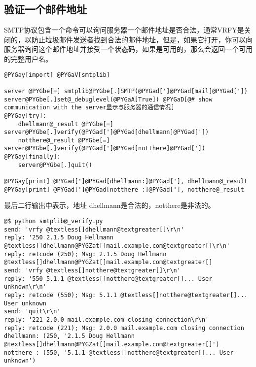\documentclass[a4paper,10pt,english]{manual}
\begin{document}
\subsection{验证一个邮件地址}

SMTP协议包含一个命令可以询问服务器一个邮件地址是否合法，通常VRFY是关闭的，以防止垃圾邮件发送者找到合法的邮件地址，但是，如果它打开，你可以向服务器询问这个邮件地址并接受一个状态码，如果是可用的，那么会返回一个可用的完整用户名。

\begin{Verbatim}[commandchars=@\[\]]
@PYGay[import] @PYGaV[smtplib]

server @PYGbe[=] smtplib@PYGbe[.]SMTP(@PYGad[']@PYGad[mail]@PYGad['])
server@PYGbe[.]set@_debuglevel(@PYGaA[True]) @PYGaD[@# show communication with the server显示与服务器的通信情况]
@PYGay[try]:
    dhellmann@_result @PYGbe[=] server@PYGbe[.]verify(@PYGad[']@PYGad[dhellmann]@PYGad['])
    notthere@_result @PYGbe[=] server@PYGbe[.]verify(@PYGad[']@PYGad[notthere]@PYGad['])
@PYGay[finally]:
    server@PYGbe[.]quit()

@PYGay[print] @PYGad[']@PYGad[dhellmann:]@PYGad['], dhellmann@_result
@PYGay[print] @PYGad[']@PYGad[notthere :]@PYGad['], notthere@_result
\end{Verbatim}

最后二行输出中表示，地址 dhellmann是合法的，notthere是非法的。

\begin{Verbatim}[commandchars=@\[\]]
@$ python smtplib@_verify.py
send: 'vrfy @textless[]dhellmann@textgreater[]\r\n'
reply: '250 2.1.5 Doug Hellmann @textless[]dhellmann@PYGZat[]mail.example.com@textgreater[]\r\n'
reply: retcode (250); Msg: 2.1.5 Doug Hellmann @textless[]dhellmann@PYGZat[]mail.example.com@textgreater[]
send: 'vrfy @textless[]notthere@textgreater[]\r\n'
reply: '550 5.1.1 @textless[]notthere@textgreater[]... User unknown\r\n'
reply: retcode (550); Msg: 5.1.1 @textless[]notthere@textgreater[]... User unknown
send: 'quit\r\n'
reply: '221 2.0.0 mail.example.com closing connection\r\n'
reply: retcode (221); Msg: 2.0.0 mail.example.com closing connection
dhellmann: (250, '2.1.5 Doug Hellmann @textless[]dhellmann@PYGZat[]mail.example.com@textgreater[]')
notthere : (550, '5.1.1 @textless[]notthere@textgreater[]... User unknown')
\end{Verbatim}
\end{document}
